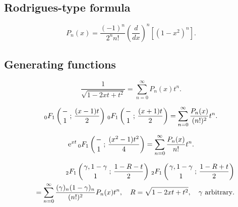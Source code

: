\documentclass[envcountchap,graybox]{svmono}
\newcommand{\hyp}[5]{\mbox{}_{#1}{F}_{#2}
\left(\genfrac{}{}{0pt}{}{#3}{#4}\,;\,#5\right)}
\newcommand{\e}{\textrm{e}}
\begin{document}
\subsection*{Rodrigues-type formula}
\begin{equation}
\label{RodLegendre}
P_n(x)=\frac{(-1)^n}{2^nn!}\left(\frac{d}{dx}\right)^n\left[(1-x^2)^n\right].
\end{equation}

\subsection*{Generating functions}
\begin{equation}
\label{GenLegendre1}
\frac{1}{\sqrt{1-2xt+t^2}}=\sum_{n=0}^{\infty}P_n(x)t^n.
\end{equation}

\begin{equation}
\label{GenLegendre2}
\hyp{0}{1}{-}{1}{\frac{(x-1)t}{2}}\,\hyp{0}{1}{-}{1}{\frac{(x+1)t}{2}}=
\sum_{n=0}^{\infty}\frac{P_n(x)}{(n!)^2}t^n.
\end{equation}

\begin{equation}
\label{GenLegendre3}
\e^{xt}\,\hyp{0}{1}{-}{1}{\frac{(x^2-1)t^2}{4}}=
\sum_{n=0}^{\infty}\frac{P_n(x)}{n!}t^n.
\end{equation}

\begin{eqnarray}
\label{GenLegendre4}
& &\hyp{2}{1}{\gamma,1-\gamma}{1}{\frac{1-R-t}{2}}\,
\hyp{2}{1}{\gamma,1-\gamma}{1}{\frac{1-R+t}{2}}\nonumber\\
& &{}=\sum_{n=0}^{\infty}\frac{(\gamma)_n(1-\gamma)_n}{(n!)^2}P_n(x)t^n,
\quad R=\sqrt{1-2xt+t^2},\quad\textrm{$\gamma$ arbitrary}.
\end{eqnarray}
\end{document}
